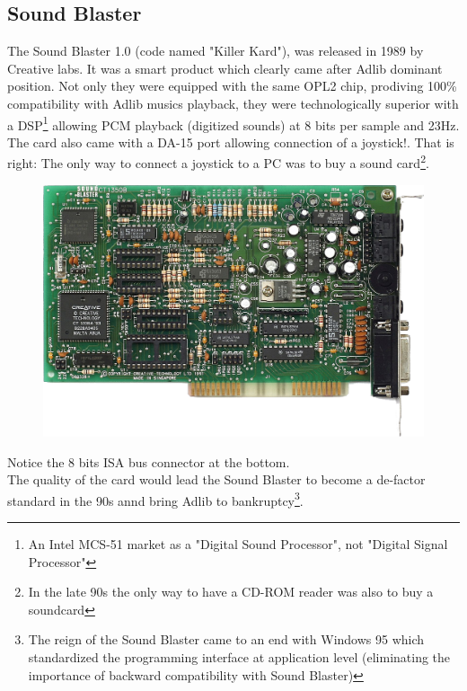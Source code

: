 \documentclass[book.tex]{subfiles}
\begin{document}
  \subsection{Sound Blaster}
  The Sound Blaster 1.0 (code named "Killer Kard"), was released in 1989 by Creative labs. It was a smart product which clearly came after Adlib dominant position. Not only they were equipped with the same OPL2 chip, prodiving 100\% compatibility with Adlib musics playback, they were technologically superior with a DSP\footnote{An Intel MCS-51 market as a "Digital Sound Processor", not "Digital Signal Processor"}  allowing PCM playback (digitized sounds) at 8 bits per sample and 23Hz. The card also came with a DA-15 port allowing connection of a joystick!. That is right: The only way to connect a joystick to a PC was to buy a sound card\footnote{In the late 90s the only way to have a CD-ROM reader was also to buy a soundcard}.\\ 
\par

\begin{figure}[H] \centering \includegraphics[width=\textwidth]{imgs/hardware/sb.png} \end{figure}
 Notice the 8 bits ISA bus connector at the bottom.\\
   The quality of the card would lead the Sound Blaster to become a de-factor standard in the 90s annd bring Adlib to bankruptcy\footnote{The reign of the Sound Blaster came to an end with Windows 95 which standardized the programming interface at application level (eliminating the importance of backward compatibility with Sound Blaster)}.
\end{document}
